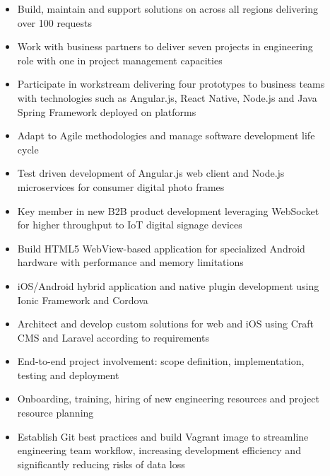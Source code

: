 {\begin{description}
    \item[]
        \begin{itemize}
            \item Build, maintain and support solutions on \iftoggle{\appinternal}{\configtermcms}{global CMS} across all regions delivering over 100 requests
            \item Work with business partners to deliver seven projects in engineering role with one in project management capacities
            \item Participate in \iftoggle{\appinternal}{\configterminnovationalt}{innovation} workstream delivering four prototypes to business teams with technologies such as Angular.js, React Native, Node.js and Java Spring Framework deployed on \iftoggle{\appinternal}{\configtermopenshift}{enterprise Openshift} platforms
            \item Adapt to Agile methodologies and manage software development life cycle
        \end{itemize}

    \item[]
        \begin{itemize}
            \item Test driven development of Angular.js web client and Node.js microservices for consumer digital photo frames
            \item Key member in new B2B product development leveraging WebSocket for higher throughput to IoT digital signage devices
            \item Build HTML5 WebView-based application for specialized Android hardware with performance and memory limitations
            \item iOS/Android hybrid application and native plugin development using Ionic Framework and Cordova
        \end{itemize}

    \item[]
        \begin{itemize}
            \item Architect and develop custom solutions for web and iOS using Craft CMS and Laravel according to requirements
            \item End-to-end project involvement: scope definition, implementation, testing and deployment
            \item Onboarding, training, hiring of new engineering resources and project resource planning
            \item Establish Git best practices and build Vagrant image to streamline engineering team workflow, increasing development efficiency and significantly reducing risks of data loss
        \end{itemize}


\end{description}}
